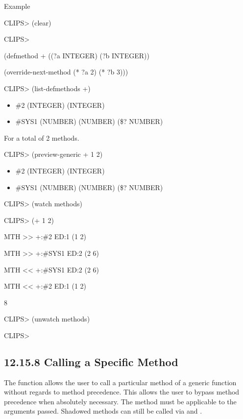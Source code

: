 \documentclass[letterpaper,10pt,english]{sphinxmanual}
\begin{document}

\begin{sphinxVerbatim}[commandchars=\\\{\}]
 
\end{sphinxVerbatim}

Example

CLIPS\textgreater{} (clear)

CLIPS\textgreater{}

(defmethod + ((?a INTEGER) (?b INTEGER))

(override-next-method (* ?a 2) (* ?b 3)))

CLIPS\textgreater{} (list-defmethods +)
\begin{itemize}
\item {} 
\#2 (INTEGER) (INTEGER)

\item {} 
\#SYS1 (NUMBER) (NUMBER) (\$? NUMBER)

\end{itemize}

For a total of 2 methods.

CLIPS\textgreater{} (preview-generic + 1 2)
\begin{itemize}
\item {} 
\#2 (INTEGER) (INTEGER)

\item {} 
\#SYS1 (NUMBER) (NUMBER) (\$? NUMBER)

\end{itemize}

CLIPS\textgreater{} (watch methods)

CLIPS\textgreater{} (+ 1 2)

MTH \textgreater{}\textgreater{} +:\#2 ED:1 (1 2)

MTH \textgreater{}\textgreater{} +:\#SYS1 ED:2 (2 6)

MTH \textless{}\textless{} +:\#SYS1 ED:2 (2 6)

MTH \textless{}\textless{} +:\#2 ED:1 (1 2)

8

CLIPS\textgreater{} (unwatch methods)

CLIPS\textgreater{}


\subsection{12.15.8 Calling a Specific Method}
\label{\detokenize{actions:calling-a-specific-method}}
The function  allows the user to call a
particular method of a generic function without regards to method
precedence. This allows the user to bypass method precedence when
absolutely necessary. The method must be applicable to the arguments
passed. Shadowed methods can still be called via 
and .
\end{document}
